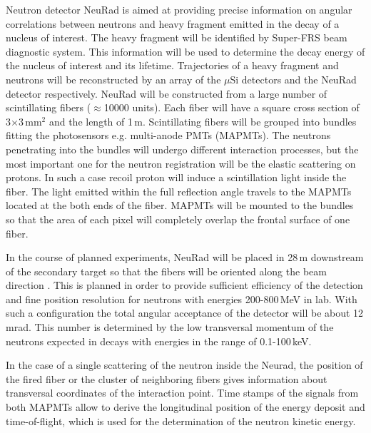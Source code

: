 \documentclass{webofc}
\begin{document}
Neutron detector NeuRad is aimed at providing precise information on angular correlations between neutrons and heavy fragment emitted in the decay of a nucleus of interest. The heavy fragment will be identified by Super-FRS beam diagnostic system. This information will be used to determine the decay energy of the nucleus of interest and its lifetime. Trajectories of a heavy fragment and neutrons will be reconstructed by an array of the $\mu$Si detectors and the NeuRad detector respectively. NeuRad will be constructed from a large number of scintillating fibers ($\approx$10000 units). Each fiber will have a square cross section of 3$\times$3\,mm$^2$ and the length of 1\,m. Scintillating fibers will be grouped into bundles fitting the photosensors e.g. multi-anode PMTs (MAPMTs).
The neutrons penetrating into the bundles will undergo different interaction processes, but the most important one for the neutron registration will be the elastic scattering on protons. In such a case recoil proton will induce a scintillation light inside the fiber. 
The light emitted within the full reflection angle travels to the MAPMTs located at the both ends of the fiber.
MAPMTs will be mounted to the bundles so that the area of each pixel will completely overlap the frontal surface of one fiber.


In the course of planned experiments, NeuRad will be placed in 28\,m downstream of the secondary target so that the fibers will be oriented along the beam direction \cite{report}.
This is planned in order to provide sufficient efficiency of the detection and fine position resolution for neutrons with energies 200-800\,MeV in lab.
With such a configuration the total angular acceptance of the detector will be about 12\,mrad. This number is determined by the low transversal momentum of the neutrons expected in decays with energies in the range of 0.1-100\,keV.  

In the case of a single scattering of the neutron inside the Neurad, the position of the fired fiber or the cluster of neighboring fibers gives information about transversal coordinates of the interaction point. Time stamps of the signals from both MAPMTs allow to derive the longitudinal position of the energy deposit and time-of-flight, which is used for the determination of the neutron kinetic energy. 
\end{document}
